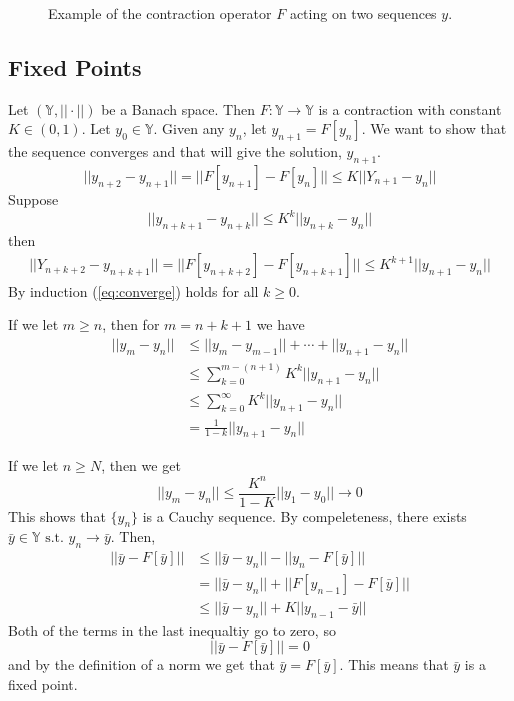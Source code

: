 \documentclass[lecture,12pt,]{pcms-l}
\theoremstyle{example}
\newcommand{\vsp}{(\mathbb{Y},||\cdot||)}
\begin{document}
\begin{figure}[ht!]
	\centering
	 \hfill
	\caption{Example of the contraction operator $F$ acting on two sequences $y$.}
	\label{fig:07contraction}
\end{figure}

\subsection{Fixed Points}
Let $\vsp$ be a Banach space. Then $F:\mathbb{Y}\to\mathbb{Y}$ is a contraction with constant $K\in(0,1)$. Let $y_0\in\mathbb{Y}$. Given any $y_n$, let $y_{n+1}=F[y_n]$. We want to show that the sequence converges and that will give the solution, $y_{n+1}$.
$$||y_{n+2}-y_{n+1}|| = ||F[y_{n+1}]-F[y_n]|| \leq K||Y_{n+1}-y_n||$$
Suppose
$$||y_{n+k+1}-y_{n+k}||\leq K^k||y_{n+k}-y_n||$$
then
\begin{align}
\label{eq:converge}
||Y_{n+k+2}-y_{n+k+1}|| = ||F[y_{n+k+2}]-F[y_{n+k+1}]|| \leq K^{k+1}||y_{n+1}-y_n||
\end{align}
By induction (\ref{eq:converge}) holds for all $k\geq0$.

If we let $m\geq n$, then for $m=n+k+1$ we have
\begin{align*}
||y_m-y_n|| &\leq ||y_m-y_{m-1}|| + \cdots + ||y_{n+1}-y_n|| \\
&\leq \sum_{k=0}^{m-(n+1)} K^k||y_{n+1}-y_n|| \\
&\leq \sum_{k=0}^\infty K^k||y_{n+1}-y_n|| \\
&= \frac{1}{1-k}||y_{n+1}-y_n||
\end{align*}

If we let $n\geq N$, then we get
$$||y_m-y_n|| \leq \frac{K^n}{1-K}||y_1-y_0||\to0$$
This shows that $\{y_n\}$ is a Cauchy sequence. By compeleteness, there exists $\bar{y}\in\mathbb{Y}\text{ s.t. } y_n\to\bar{y}$. Then,
\begin{align*}
||\bar{y}-F[\bar{y}]|| &\leq ||\bar{y}-y_n|| - ||y_n-F[\bar{y}]|| \\
&= ||\bar{y}-y_n|| + ||F[y_{n-1}]-F[\bar{y}]|| \\
&\leq ||\bar{y}-y_n|| + K||y_{n-1}-\bar{y}||
\end{align*}
Both of the terms in the last inequaltiy go to zero, so
$$||\bar{y}-F[\bar{y}]|| = 0$$
and by the definition of a norm we get that $\bar{y}=F[\bar{y}]$. This means that $\bar{y}$ is a fixed point.
\end{document}
